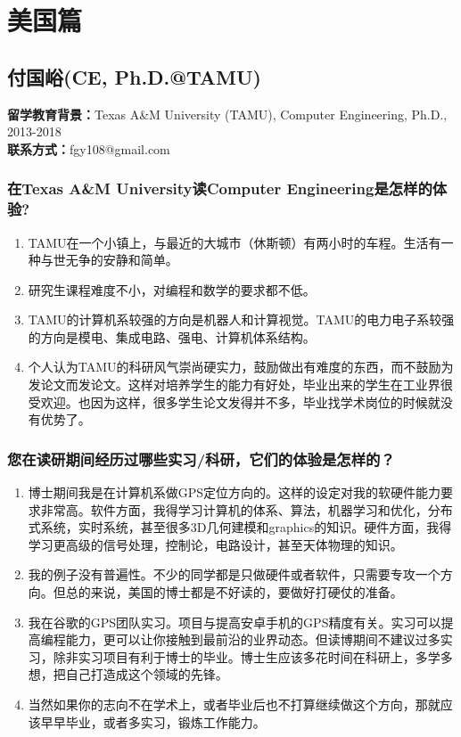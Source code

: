 \documentclass[a4paper,UTF8]{book}
\begin{document}
\section{美国篇}
\subsection{付国峪(CE, Ph.D.@TAMU)}
    \textbf{留学教育背景：}Texas A\&M University (TAMU), Computer Engineering, Ph.D., 2013-2018\\
    \textbf{联系方式：}fgy108@gmail.com

    \subsubsection*{在Texas A\&M University读Computer Engineering是怎样的体验?}
        \begin{enumerate}[itemindent=0pt,itemsep=0pt,parsep=0pt]
            \item TAMU在一个小镇上，与最近的大城市（休斯顿）有两小时的车程。生活有一种与世无争的安静和简单。
            \item 研究生课程难度不小，对编程和数学的要求都不低。
            \item TAMU的计算机系较强的方向是机器人和计算视觉。TAMU的电力电子系较强的方向是模电、集成电路、强电、计算机体系结构。
            \item 个人认为TAMU的科研风气崇尚硬实力，鼓励做出有难度的东西，而不鼓励为发论文而发论文。这样对培养学生的能力有好处，毕业出来的学生在工业界很受欢迎。也因为这样，很多学生论文发得并不多，毕业找学术岗位的时候就没有优势了。
        \end{enumerate}
    \subsubsection*{您在读研期间经历过哪些实习/科研，它们的体验是怎样的？}
        \begin{enumerate}[itemindent=0pt,itemsep=0pt,parsep=0pt]
            \item 博士期间我是在计算机系做GPS定位方向的。这样的设定对我的软硬件能力要求非常高。软件方面，我得学习计算机的体系、算法，机器学习和优化，分布式系统，实时系统，甚至很多3D几何建模和graphics的知识。硬件方面，我得学习更高级的信号处理，控制论，电路设计，甚至天体物理的知识。
            \item 我的例子没有普遍性。不少的同学都是只做硬件或者软件，只需要专攻一个方向。但总的来说，美国的博士都是不好读的，要做好打硬仗的准备。
            \item 我在谷歌的GPS团队实习。项目与提高安卓手机的GPS精度有关。实习可以提高编程能力，更可以让你接触到最前沿的业界动态。但读博期间不建议过多实习，除非实习项目有利于博士的毕业。博士生应该多花时间在科研上，多学多想，把自己打造成这个领域的先锋。
            \item 当然如果你的志向不在学术上，或者毕业后也不打算继续做这个方向，那就应该早早毕业，或者多实习，锻炼工作能力。
        \end{enumerate}
\end{document}
